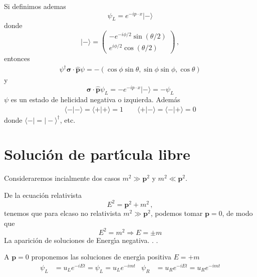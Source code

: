 Si definimos ademas
\begin{equation}
  \psi_L=e^{-i p\cdot x}|-\rangle
\end{equation}
donde
\begin{equation}
|-\rangle=  \begin{pmatrix}
  -e^{-i \phi/2}\sin(\theta/2)\\ 
  e^{i \phi/2}\cos(\theta/2)
  \end{pmatrix}\,,
\end{equation}
entonces
\begin{align}
  \psi^\dagger\boldsymbol{\sigma}\cdot\hat{\mathbf{p}}\psi=-(\cos\phi\sin\theta,\sin\phi\sin\phi,\cos\theta)
\end{align}
y
\begin{equation}
  \label{eq:215}
  \boldsymbol{\sigma}\cdot\hat{\mathbf{p}}\psi_L=-e^{-i p\cdot x}|-\rangle=-\psi_L
\end{equation}
$\psi$ es un estado de helicidad negativa o izquierda. Adem\'as
\begin{align}
  \langle-|-\rangle=\langle+|+\rangle=1\qquad \langle+|-\rangle=\langle-|+\rangle=0
\end{align}
donde $\langle-|=|-\rangle^\dagger$, etc.
\section{Soluci\'on de part\'\i cula libre}
\label{sec:solucion-de-parti}
Consideraremos incialmente dos casos $m^2\gg\mathbf{p}^2$ y $m^2\ll\mathbf{p}^2$.

De la ecuaci\'on relativista
\begin{equation}
  \label{eq:213}
  E^2=\mathbf{p}^2+m^2\,,
\end{equation}
tenemos que para elcaso no relativista $m^2\gg\mathbf{p}^2$, podemos tomar $\mathbf{p}=0$, de modo que
\begin{equation}
  E^2=m^2\Rightarrow E=\pm m
\end{equation}
La aparici\'on de soluciones de Energ\'\i a negativa. . .

A $\mathbf{p}=0$ proponemos las soluciones de energ\'\i a positiva $E=+m$
\begin{align}
  \label{eq:210}
  \psi_L&=u_L e^{-i E t}=\psi_L=u_L e^{-i m t} & \psi_R&=u_R e^{-i E t}=u_R e^{-i m t}
\end{align}

